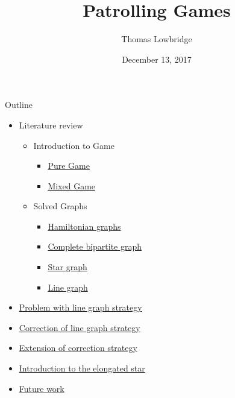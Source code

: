 \documentclass[11pt]{beamer}
\author{Thomas Lowbridge}
\title{Patrolling Games}
\institute{University Of Nottingham}
\date{December 13, 2017}
\begin{document}
\hypertarget{Patrolling Games}{}
\begin{frame}
\titlepage
\end{frame}


\begin{frame}{Outline}

\begin{itemize}
\item Literature review
 \begin{itemize}
 \item Introduction to Game
  \begin{itemize}
  \item \hyperlink{Introduction to Game: Pure Game}{Pure Game}
  \item \hyperlink{Introduction to Game: Mixed Game}{Mixed Game}
  \end{itemize}
 \item Solved Graphs
  \begin{itemize}
  \item \hyperlink{Solved Graphs: Hamiltonian graphs}{Hamiltonian graphs}
  \item \hyperlink{Solved Graphs: Complete bipartite graphs}{Complete bipartite graph}
  \item \hyperlink{Solved Graphs: Star graph}{Star graph}
  \item \hyperlink{Solved Graphs: Line graph}{Line graph}
  \end{itemize}   
 \end{itemize}
\item \hyperlink{Problem with line graph strategy}{Problem with line graph strategy}
\item \hyperlink{Correction of line graph strategy}{Correction of line graph strategy}
\item \hyperlink{Extension of correction strategy}{Extension of correction strategy}
\item \hyperlink{Introduction to the elongated star}{Introduction to the elongated star}
\item \hyperlink{Future work}{Future work}
\end{itemize}
\end{frame}
\end{document}

